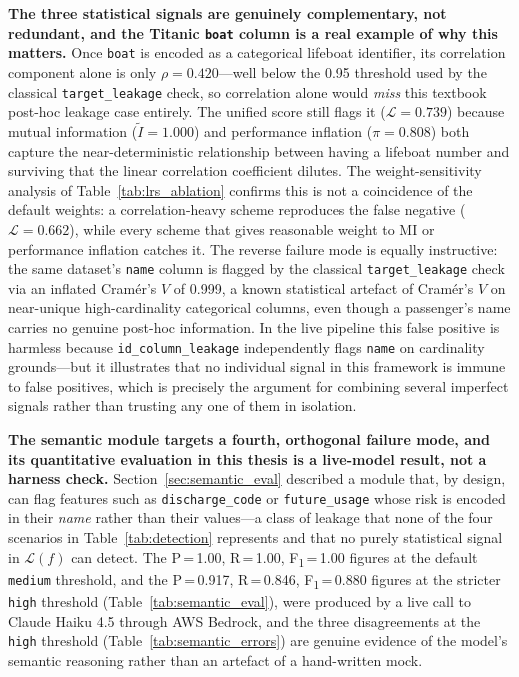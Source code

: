 \documentclass[12pt,a4paper]{report}
\begin{document}
\textbf{The three statistical signals are genuinely complementary, not redundant, and the
Titanic \texttt{boat} column is a real example of why this matters.}  Once \texttt{boat}
is encoded as a categorical lifeboat identifier, its correlation component alone is only
$\rho{=}0.420$---well below the 0.95 threshold used by the classical
\texttt{target\_leakage} check, so correlation alone would \emph{miss} this textbook
post-hoc leakage case entirely.  The unified score still flags it
($\mathcal{L}{=}0.739$) because mutual information ($\tilde I{=}1.000$) and performance
inflation ($\pi{=}0.808$) both capture the near-deterministic relationship between having
a lifeboat number and surviving that the linear correlation coefficient dilutes.  The
weight-sensitivity analysis of Table~\ref{tab:lrs_ablation} confirms this is not a
coincidence of the default weights: a correlation-heavy scheme reproduces the false
negative ($\mathcal{L}=0.662$), while every scheme that gives reasonable weight to MI or
performance inflation catches it.  The reverse failure mode is equally instructive: the
same dataset's \texttt{name} column is flagged by the classical \texttt{target\_leakage}
check via an inflated Cram\'er's $V$ of 0.999, a known statistical artefact of Cram\'er's
$V$ on near-unique high-cardinality categorical columns, even though a passenger's name
carries no genuine post-hoc information.  In the live pipeline this false positive is
harmless because \texttt{id\_column\_leakage} independently flags \texttt{name} on
cardinality grounds---but it illustrates that no individual signal in this framework is
immune to false positives, which is precisely the argument for combining several
imperfect signals rather than trusting any one of them in isolation.

\textbf{The semantic module targets a fourth, orthogonal failure mode, and its
quantitative evaluation in this thesis is a live-model result, not a harness check.}
Section~\ref{sec:semantic_eval} described a module that, by design, can flag
features such as \texttt{discharge\_code} or \texttt{future\_usage} whose risk is encoded
in their \emph{name} rather than their values---a class of leakage that none of the four
scenarios in Table~\ref{tab:detection} represents and that no purely statistical signal in
$\mathcal{L}(f)$ can detect.  The P\,=\,1.00, R\,=\,1.00,
F\textsubscript{1}\,=\,1.00 figures at the default \texttt{medium} threshold, and the
P\,=\,0.917, R\,=\,0.846, F\textsubscript{1}\,=\,0.880 figures at the stricter
\texttt{high} threshold (Table~\ref{tab:semantic_eval}), were produced by a live call to
Claude Haiku 4.5 through AWS Bedrock, and the three disagreements at the \texttt{high}
threshold (Table~\ref{tab:semantic_errors}) are genuine evidence of the model's semantic
reasoning rather than an artefact of a hand-written mock.
\end{document}
